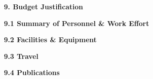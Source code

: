%

{\bf\large 9. Budget Justification} 

{\bf 9.1 Summary of Personnel \& Work Effort}

{\bf 9.2 Facilities \& Equipment}

{\bf 9.3 Travel}

{\bf 9.4 Publications}